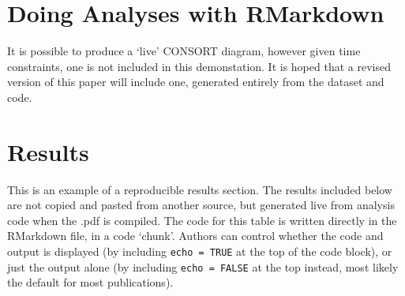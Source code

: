 \documentclass[10pt,letterpaper]{article}
\begin{document}
\hypertarget{doing-analyses-with-rmarkdown}{%
\section{Doing Analyses with
RMarkdown}\label{doing-analyses-with-rmarkdown}}

It is possible to produce a `live' CONSORT diagram, however given time
constraints, one is not included in this demonstation. It is hoped that
a revised version of this paper will include one, generated entirely
from the dataset and code.

\hypertarget{results}{%
\section{Results}\label{results}}

This is an example of a reproducible results section. The results
included below are not copied and pasted from another source, but
generated live from analysis code when the .pdf is compiled. The code
for this table is written directly in the RMarkdown file, in a code
`chunk'. Authors can control whether the code and output is displayed
(by including \texttt{echo\ =\ TRUE} at the top of the code block), or
just the output alone (by including \texttt{echo\ =\ FALSE} at the top
instead, most likely the default for most publications).
\end{document}
